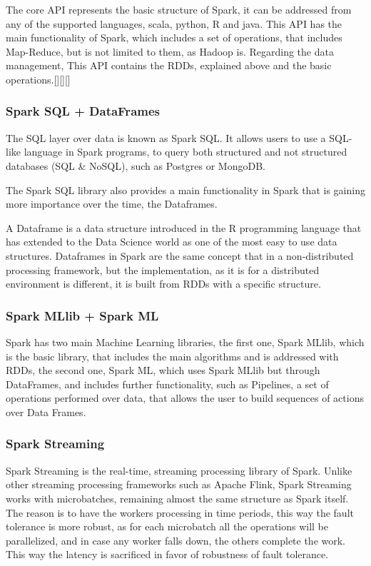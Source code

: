 \documentclass[11pt]{article} %
\begin{document}
          The core API represents the basic structure of Spark, it can be addressed from any of the supported languages, scala, python, R and java. This API has the main functionality of Spark, which includes a set of operations, that includes Map-Reduce, but is not limited to them, as Hadoop is.
          Regarding the data management, This API contains the RDDs, explained above and the basic operations.[][][]

        \subsubsection*{Spark SQL + DataFrames}

          The SQL layer over data is known as Spark SQL. It allows users to use a SQL-like language in Spark programs, to query both structured and not structured databases (SQL \& NoSQL), such as Postgres or MongoDB.

          The Spark SQL library also provides a main functionality in Spark that is gaining more importance over the time, the Dataframes.

          A Dataframe is a data structure introduced in the R programming language that has extended to the Data Science world as one of the most easy to use data structures. Dataframes in Spark are the same concept that in a non-distributed processing framework, but the implementation, as it is for a distributed environment is different, it is built from RDDs with a specific structure.

        \subsubsection*{Spark MLlib + Spark ML}

          Spark has two main Machine Learning libraries, the first one, Spark MLlib, which is the basic library, that includes the main algorithms and is addressed with RDDs, the second one, Spark ML, which uses Spark MLlib but through DataFrames, and includes further functionality, such as Pipelines, a set of operations performed over data, that allows the user to build sequences of actions over Data Frames.

        \subsubsection{Spark Streaming}

          Spark Streaming is the real-time, streaming processing library of Spark. Unlike other streaming processing frameworks such as Apache Flink, Spark Streaming works with microbatches, remaining almost the same structure as Spark itself. The reason is to have the workers processing in time periods, this way the fault tolerance is more robust, as for each microbatch all the operations will be parallelized, and in case any worker falls down, the others complete the work. This way the latency is sacrificed in favor of robustness of fault tolerance.
\end{document}
